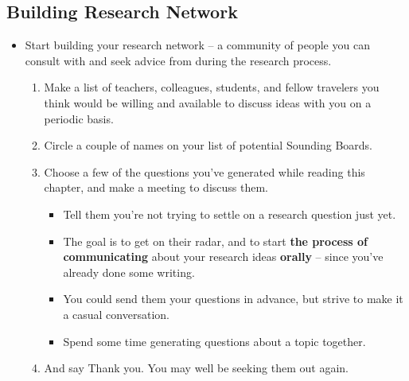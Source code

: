 \documentclass[11pt]{article}
\begin{document}
\subsection{Building Research Network}
\begin{itemize}
\item  \begin{exercise}

Start building your research network -- a community of people you can consult with and seek advice from during the research process. 
\begin{enumerate}
\item Make a list of teachers, colleagues, students, and fellow travelers you think would be willing and available to discuss ideas with you on a periodic basis. 

\item Circle a couple of names on your list of potential Sounding Boards.

\item Choose a few of the questions you’ve generated while reading this chapter, and make a meeting to discuss them. 
\begin{itemize}
\item  Tell them you’re not trying to settle on a research question just yet. 
 
\item  The goal is to get on their radar, and to start \textbf{the process of communicating} about your research ideas \textbf{orally} -- since you’ve already done some writing.

\item  You could send them your questions in advance, but strive to make it a casual conversation.

\item Spend some time generating questions about a topic together.
\end{itemize}

\item And say Thank you. You may well be seeking them out again.
\end{enumerate}
\end{exercise}
\end{itemize}
\end{document}
